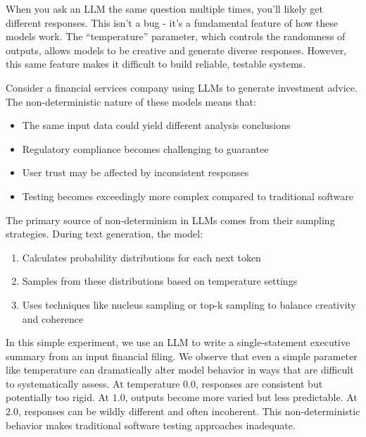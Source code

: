 When you ask an LLM the same question multiple times, you'll likely get different responses. This isn't a bug - it's a fundamental feature of how these models work. The ``temperature'' parameter, which controls the randomness of outputs, allows models to be creative and generate diverse responses. However, this same feature makes it difficult to build reliable, testable systems.

Consider a financial services company using LLMs to generate investment advice. The non-deterministic nature of these models means that:
\begin{itemize}
    \item The same input data could yield different analysis conclusions
    \item Regulatory compliance becomes challenging to guarantee
    \item User trust may be affected by inconsistent responses
    \item Testing becomes exceedingly more complex compared to traditional software
\end{itemize}

The primary source of non-determinism in LLMs comes from their sampling strategies. During text generation, the model:
\begin{enumerate}
    \item Calculates probability distributions for each next token
    \item Samples from these distributions based on temperature settings
    \item Uses techniques like nucleus sampling  or top-k sampling to balance creativity and coherence
\end{enumerate}

In this simple experiment, we use an LLM to write a single-statement executive summary from an input financial filing. We observe that even a simple parameter like temperature can dramatically alter model behavior in ways that are difficult to systematically assess. At temperature $0.0$, responses are consistent but potentially too rigid. At $1.0$, outputs become more varied but less predictable. At $2.0$, responses can be wildly different and often incoherent. This non-deterministic behavior makes traditional software testing approaches inadequate.


